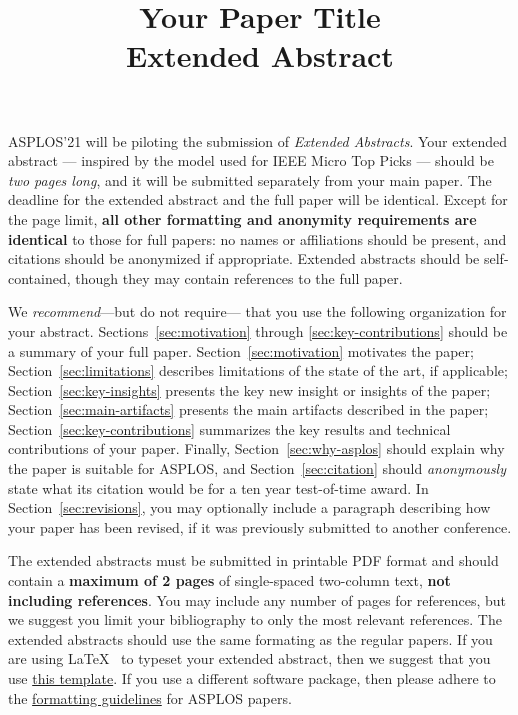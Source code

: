 \documentclass[pageno]{jpaper}
\begin{document}
\title{Your Paper Title \\ \textbf{Extended Abstract}}

\date{}

\maketitle

\thispagestyle{empty}




ASPLOS'21 will be piloting the submission of {\it Extended
Abstracts}. Your extended abstract — inspired by the model used for
IEEE Micro Top
Picks — should be {\it two pages long}, and it will be submitted separately
from your main paper. The deadline for the extended abstract and the
full paper will be identical. Except for the page limit, \textbf{all other
formatting and anonymity requirements are identical} to those for full
papers: no names or affiliations should be present, and citations should
be anonymized if appropriate. Extended abstracts should be self-contained, though they may
contain references to the full paper.

We \emph{recommend}---but do not require--- that you use
the following organization for your abstract. 
Sections~\ref{sec:motivation} through \ref{sec:key-contributions}
should be a summary of your full paper. Section~\ref{sec:motivation}
motivates the paper; Section~\ref{sec:limitations} describes
limitations of the state of the art, if applicable;
Section~\ref{sec:key-insights} presents the key new insight or
insights of the paper; 
Section~\ref{sec:main-artifacts} presents the main artifacts described
in the paper;  Section~\ref{sec:key-contributions} summarizes the key
results and technical contributions of your paper. Finally,
Section~\ref{sec:why-asplos} should explain why the paper is suitable
for ASPLOS, and Section~\ref{sec:citation} should \emph{anonymously} state what its
citation would be for a ten year test-of-time award. In
Section~\ref{sec:revisions}, you may optionally include a paragraph
describing how your paper has been revised, if it was previously
submitted to another conference.

The extended abstracts must be submitted in printable PDF format and should contain a
{\bf maximum of 2 pages} of single-spaced two-column text, {\bf not
  including references}.  You may include any number of pages for
references, but we suggest you limit your bibliography to
only the most relevant references. The extended
abstracts should use the same formating as the regular papers. If you are using
\LaTeX~\cite{lamport94} to typeset your extended abstract, then we suggest that
you use \href{https://asplos-conference.org/wp-content/uploads/2020/06/asplos21-templates.zip}{this template}.
If you use a different
software package, then please adhere to the
\href{https://asplos-conference.org/wp-content/uploads/2020/06/asplos21-paper-template.pdf}{formatting guidelines}
for ASPLOS papers.
\end{document}
